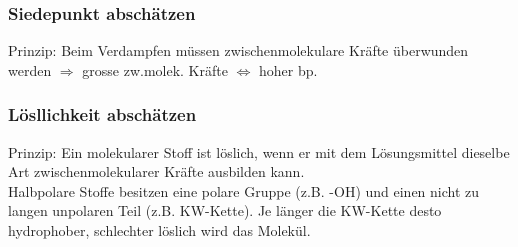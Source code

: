 \subsubsection{Siedepunkt abschätzen}
Prinzip: Beim Verdampfen müssen zwischenmolekulare Kräfte überwunden werden $\Rightarrow$ grosse zw.molek. Kräfte $\Leftrightarrow$ hoher bp.
\subsubsection{Lösllichkeit abschätzen}
Prinzip: Ein molekularer Stoff ist löslich, wenn er mit dem Lösungsmittel dieselbe Art zwischenmolekularer Kräfte ausbilden kann. \\
Halbpolare Stoffe besitzen eine polare Gruppe (z.B. -OH) und einen nicht zu langen unpolaren Teil (z.B. KW-Kette). Je länger die KW-Kette desto hydrophober, schlechter löslich wird das Molekül.